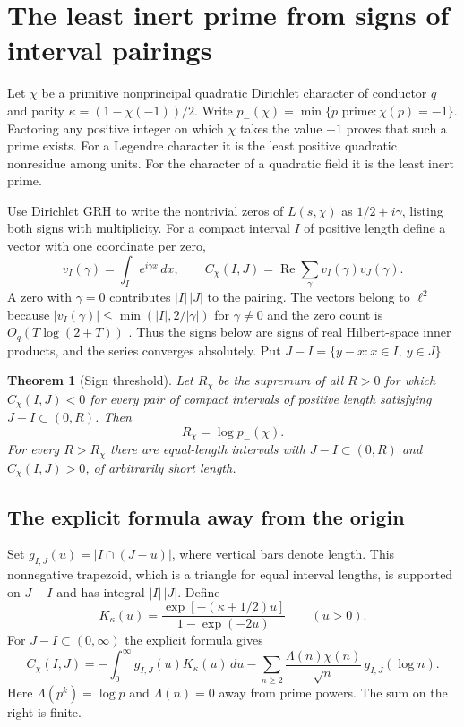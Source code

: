 \documentclass[11pt,letterpaper]{article}
\newtheorem{theorem}{Theorem}[section]
\theoremstyle{remark}\newtheorem{remark}[theorem]{Remark}
\begin{document}
\section{The least inert prime from signs of interval pairings}\label{sec:spectral}

Let $\chi$ be a primitive nonprincipal quadratic Dirichlet character of
conductor $q$ and parity $\kappa=(1-\chi(-1))/2$. Write
$p_-(\chi)=\min\{p\text{ prime}:\chi(p)=-1\}$. Factoring any positive integer on which $\chi$ takes the value $-1$ proves that such a prime exists.
For a Legendre character it is the least positive quadratic nonresidue among units.
For the character of a quadratic field it is the least inert prime.

Use Dirichlet GRH to write the nontrivial zeros of $L(s,\chi)$ as
$1/2+i\gamma$, listing both signs with multiplicity. For a compact interval
$I$ of positive length define a vector with one coordinate per zero,
\[
 v_I(\gamma)=\int_I e^{i\gamma x}\,dx,\qquad
 C_\chi(I,J)=\operatorname{Re}\sum_{\gamma}
                  \overline{v_I(\gamma)}v_J(\gamma).
\]
A zero with $\gamma=0$ contributes $|I|\,|J|$ to the pairing.
The vectors belong to $\ell^2$ because
$|v_I(\gamma)|\leq\min(|I|,2/|\gamma|)$ for $\gamma\ne0$ and the
zero count is $O_q(T\log(2+T))$ \cite{zeroct}. Thus the signs below are
signs of real Hilbert-space inner products, and the series converges
absolutely. Put $J-I=\{y-x:x\in I,\ y\in J\}$.

\begin{theorem}[Sign threshold]\label{thm:signthreshold}
Let $R_\chi$ be the supremum of all $R>0$ for which
$C_\chi(I,J)<0$ for every pair of compact intervals of positive length
satisfying $J-I\subset (0,R)$. Then
\[
                        R_\chi=\log p_-(\chi).
\]
For every $R>R_\chi$ there are equal-length intervals with
$J-I\subset(0,R)$ and $C_\chi(I,J)>0$, of arbitrarily short length.
\end{theorem}

\subsection*{The explicit formula away from the origin}

Set $g_{I,J}(u)=|I\cap(J-u)|$, where vertical bars denote length. This
nonnegative trapezoid, which is a triangle for equal interval lengths, is
supported on $J-I$ and has integral $|I|\,|J|$. Define
\[
       K_\kappa(u)=\frac{\exp[-(\kappa+1/2)u]}{1-\exp(-2u)}
       \qquad (u>0).
\]
For $J-I\subset(0,\infty)$ the explicit formula gives
\begin{equation}\label{eq:packetweil}
 C_\chi(I,J)=-\int_0^\infty g_{I,J}(u)K_\kappa(u)\,du
        -\sum_{n\ge2}\frac{\Lambda(n)\chi(n)}{\sqrt n}\,
                         g_{I,J}(\log n).
\end{equation}
Here $\Lambda(p^k)=\log p$ and $\Lambda(n)=0$ away from prime powers.
The sum on the right is finite.
\end{document}
